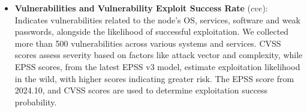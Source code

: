 \begin{itemize}
     \item \textbf{Vulnerabilities and Vulnerability Exploit Success Rate} ($cve$): Indicates vulnerabilities related to the node's OS, services, software and weak passwords, alongside the likelihood of successful exploitation. We collected more than 500 vulnerabilities across various systems and services. CVSS scores assess severity based on factors like attack vector and complexity, while EPSS scores, from the latest EPSS v3 model, estimate exploitation likelihood in the wild, with higher scores indicating greater risk. The EPSS score from 2024.10, and CVSS  scores are used to determine exploitation success probability.
\end{itemize}

